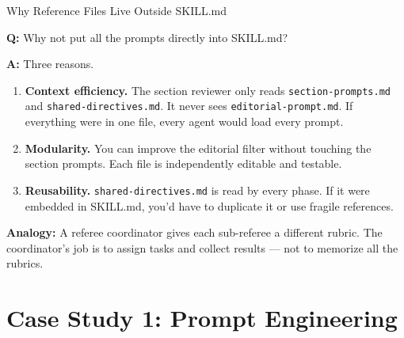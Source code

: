 \documentclass[10pt,english,aspectratio=169]{beamer}
\begin{document}
\begin{frame}{Why Reference Files Live Outside SKILL.md}

\textbf{Q:} Why not put all the prompts directly into SKILL.md?

\vspace{0.3cm}
\textbf{A:} Three reasons.

\vspace{0.2cm}
\begin{enumerate}
    \item \textbf{Context efficiency.} The section reviewer only reads \texttt{section-prompts.md} and \texttt{shared-directives.md}. It never sees \texttt{editorial-prompt.md}. If everything were in one file, every agent would load every prompt.

    \vspace{0.2cm}
    \item \textbf{Modularity.} You can improve the editorial filter without touching the section prompts. Each file is independently editable and testable.

    \vspace{0.2cm}
    \item \textbf{Reusability.} \texttt{shared-directives.md} is read by every phase. If it were embedded in SKILL.md, you'd have to duplicate it or use fragile references.
\end{enumerate}

\vspace{0.3cm}
\textbf{Analogy:} A referee coordinator gives each sub-referee a different rubric. The coordinator's job is to assign tasks and collect results --- not to memorize all the rubrics.

\end{frame}


\section{Case Study 1: Prompt Engineering}
\end{document}
